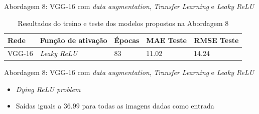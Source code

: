 \begin{frame}{\large{Abordagem 8: VGG-16 com \emph{data augmentation}, \emph{Transfer Learning} e \emph{Leaky ReLU}}}
  \begin{table}[!ht]
  \centering
  \caption{Resultados do treino e teste dos modelos propostos na Abordagem 8}
  \label{tab:results-8}
   \begin{tabular}{l l l l l }
  	 \toprule
  	 Rede & Função de ativação & Épocas & MAE Teste & RMSE Teste \\
  	 \midrule
  	 VGG-16 & \emph{Leaky ReLU} & 83 & 11.02 & 14.24 \\
  	 \bottomrule
   \end{tabular}
 \end{table}
\end{frame}

\begin{frame}{\large{Abordagem 8: VGG-16 com \emph{data augmentation}, \emph{Transfer Learning} e \emph{Leaky ReLU}}}
  \begin{itemize}
    \item \emph{Dying ReLU problem}
    \item Saídas iguais a $36.99$ para todas as imagens dadas como entrada
  \end{itemize}
\end{frame}




